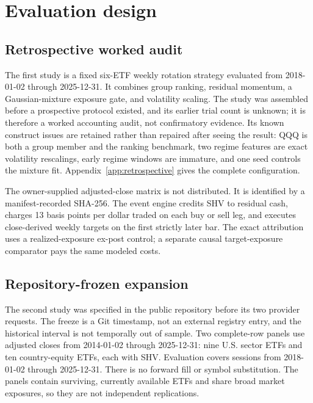 \documentclass{article}
\begin{document}
\section{Evaluation design}

\subsection{Retrospective worked audit}

The first study is a fixed six-ETF weekly rotation strategy evaluated from
2018-01-02 through 2025-12-31. It combines group ranking, residual momentum, a
Gaussian-mixture exposure gate, and volatility scaling. The study was assembled
before a prospective protocol existed, and its earlier trial count is unknown;
it is therefore a worked accounting audit, not confirmatory evidence. Its
known construct issues are retained rather than repaired after seeing the
result: QQQ is both a group member and the ranking benchmark, two regime
features are exact volatility rescalings, early regime windows are immature,
and one seed controls the mixture fit. Appendix~\ref{app:retrospective} gives the
complete configuration.

The owner-supplied adjusted-close matrix is not distributed. It is identified by
a manifest-recorded SHA-256. The event engine credits SHV to residual
cash, charges 13 basis points per dollar traded on each buy or sell leg, and
executes close-derived weekly targets on the first strictly later bar. The
exact attribution uses a realized-exposure ex-post control; a separate causal
target-exposure comparator pays the same modeled costs.

\subsection{Repository-frozen expansion}

The second study was specified in the public repository before its two provider
requests. The freeze is a Git timestamp, not an external registry entry, and the
historical interval is not temporally out of sample. Two complete-row panels use
adjusted closes from 2014-01-02 through 2025-12-31: nine U.S. sector ETFs and ten
country-equity ETFs, each with SHV. Evaluation covers
\ExpansionEvaluationSessions{} sessions from 2018-01-02 through 2025-12-31.
There is no forward fill or symbol substitution. The panels contain surviving,
currently available ETFs and share broad market exposures, so they are not
independent replications.
\end{document}
